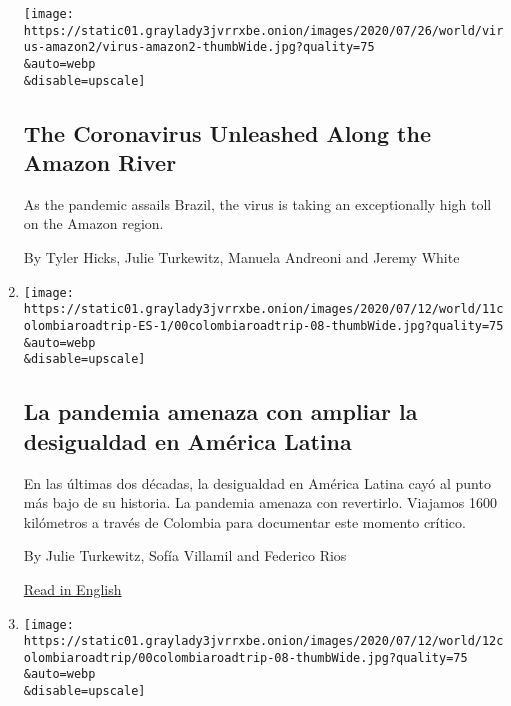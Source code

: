 \begin{enumerate}
  \texttt{[image: https://static01.graylady3jvrrxbe.onion/images/2020/07/26/world/virus-amazon2/virus-amazon2-thumbWide.jpg?quality=75\\\&auto=webp\\\&disable=upscale]}

  \hypertarget{the-coronavirus-unleashed-along-the-amazon-river}{%
  \subsection{The Coronavirus Unleashed Along the Amazon
  River}\label{the-coronavirus-unleashed-along-the-amazon-river}}

  As the pandemic assails Brazil, the virus is taking an exceptionally
  high toll on the Amazon region.

  By Tyler Hicks, Julie Turkewitz, Manuela Andreoni and Jeremy White
\item
  \href{/es/2020/07/11/espanol/america-latina/desigualdad-coronavirus-america-latina-colombia.html}{}

  \texttt{[image: https://static01.graylady3jvrrxbe.onion/images/2020/07/12/world/11colombiaroadtrip-ES-1/00colombiaroadtrip-08-thumbWide.jpg?quality=75\\\&auto=webp\\\&disable=upscale]}

  \hypertarget{la-pandemia-amenaza-con-ampliar-la-desigualdad-en-amuxe9rica-latina}{%
  \subsection{La pandemia amenaza con ampliar la desigualdad en América
  Latina}\label{la-pandemia-amenaza-con-ampliar-la-desigualdad-en-amuxe9rica-latina}}

  En las últimas dos décadas, la desigualdad en América Latina cayó al
  punto más bajo de su historia. La pandemia amenaza con revertirlo.
  Viajamos 1600 kilómetros a través de Colombia para documentar este
  momento crítico.

  By Julie Turkewitz, Sofía Villamil and Federico Rios

  \href{https://www.nytimes3xbfgragh.onion/2020/07/11/world/americas/coronavirus-latin-america-inequality.html}{Read
  in English}
\item
  \href{/2020/07/11/world/americas/coronavirus-latin-america-inequality.html}{}

  \texttt{[image: https://static01.graylady3jvrrxbe.onion/images/2020/07/12/world/12colombiaroadtrip/00colombiaroadtrip-08-thumbWide.jpg?quality=75\\\&auto=webp\\\&disable=upscale]}

  \hypertarget{in-latin-america-the-pandemic-threatens-equality-like-never-before}{%
}
\end{enumerate}
